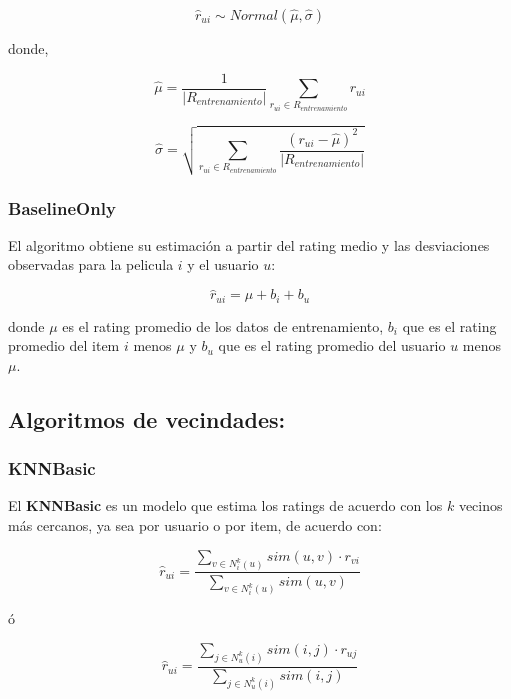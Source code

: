\documentclass{article}
\begin{document}
\begin{equation}
    \hat r_{ui}\sim Normal(\hat \mu, \hat \sigma)
\end{equation}

donde,

\begin{equation}
\hat \mu = \frac{1}{|R_{entrenamiento}|}\sum_{r_{ui} \in R_{entrenamiento}} r_{ui}
\end{equation}

\begin{equation}
\hat \sigma= \sqrt{\sum_{r_{ui} \in R_{entrenamiento}} \frac{(r_{ui}-\hat \mu)^2}{|R_{entrenamiento}|}}
\end{equation}


\subsubsection{BaselineOnly}

El algoritmo obtiene su estimación a partir del rating medio y las desviaciones observadas para la pelicula $i$ y el usuario $u$:

\begin{equation}
\hat r_{ui}= \mu + b_i + b_u
\end{equation}

donde $\mu$ es el rating promedio de los datos de entrenamiento, $b_i$ que es el rating promedio del item $i$ menos $\mu$ y $b_u$ que es el rating promedio del usuario $u$ menos $\mu$.


\subsection{Algoritmos de vecindades:}

\subsubsection{KNNBasic}

El \textbf{KNNBasic} es un modelo que estima los ratings de acuerdo con los $k$ vecinos más cercanos, ya sea por usuario o por item, de acuerdo con:

\begin{equation}
\hat r_{ui}=\frac{\sum_{v\in N_i^k(u)}sim(u,v) \cdot r_{vi}}{\sum_{v\in N_i^k(u)}sim(u,v)}
\end{equation}

ó

\begin{equation}
\hat r_{ui}=\frac{\sum_{j\in N_u^k(i)}sim(i,j) \cdot r_{uj}}{\sum_{j\in N_u^k(i)}sim(i,j)}
\end{equation}
\end{document}
